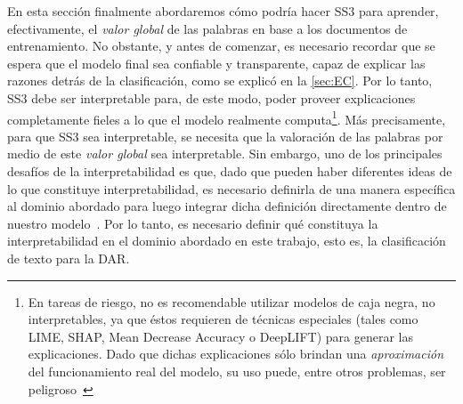 En esta sección finalmente abordaremos cómo podría hacer SS3 para aprender, efectivamente, el \emph{valor global} de las palabras en base a los documentos de entrenamiento.
No obstante, y antes de comenzar, es necesario recordar que se espera que el modelo final sea confiable y transparente, capaz de explicar las razones detrás de la clasificación, como se explicó en la \autoref{sec:EC}.
Por lo tanto, SS3 debe ser interpretable para, de este modo, poder proveer explicaciones completamente fieles a lo que el modelo realmente computa\footnote{En tareas de riesgo, no es recomendable utilizar modelos de caja negra, no interpretables, ya que éstos requieren de técnicas especiales (tales como LIME, SHAP, Mean Decrease Accuracy o DeepLIFT) para generar las explicaciones. Dado que dichas explicaciones sólo brindan una \emph{aproximación} del funcionamiento real del modelo, su uso puede, entre otros problemas, ser peligroso~\cite{rudin2019stop}}.
Más precisamente, para que SS3 sea interpretable, se necesita que la valoración de las palabras por medio de este \emph{valor global} sea interpretable.
Sin embargo, uno de los principales desafíos de la interpretabilidad es que, dado que  pueden haber diferentes ideas de lo que constituye interpretabilidad, es necesario definirla de una manera específica al dominio abordado para luego integrar dicha definición directamente dentro de nuestro modelo~\cite{rudin2019stop}. 
Por lo tanto, es necesario definir qué constituya la interpretabilidad en el dominio abordado en este trabajo, esto es, la clasificación de texto para la DAR.

